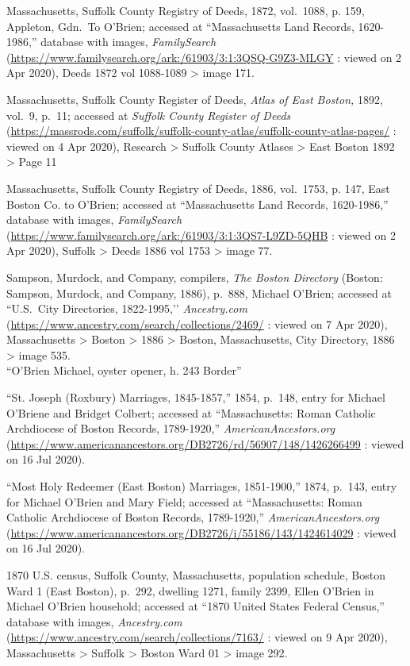 \begin{thebibliography}{999}
	Massachusetts, Suffolk County Registry of Deeds, 1872, vol.\ 1088, p. 159, Appleton, Gdn.\ To O’Brien; accessed at ``Massachusetts Land Records, 1620-1986,'' database with images, \textit{FamilySearch} (\url{https://www.familysearch.org/ark:/61903/3:1:3QSQ-G9Z3-MLGY} : viewed on 2 Apr 2020), Deeds 1872 vol 1088-1089 > image 171.
	
	Massachusetts, Suffolk County Register of Deeds, \textit{Atlas of East Boston,} 1892, vol.\ 9, p.\ 11; accessed at \textit{Suffolk County Register of Deeds} (\url{https://massrods.com/suffolk/suffolk-county-atlas/suffolk-county-atlas-pages/} : viewed on 4 Apr 2020), Research > Suffolk County Atlases > East Boston 1892 > Page 11
	
	Massachusetts, Suffolk County Registry of Deeds, 1886, vol.\ 1753, p. 147, East Boston Co. to O’Brien; accessed at ``Massachusetts Land Records, 1620-1986,'' database with images, \textit{FamilySearch} (\url{https://www.familysearch.org/ark:/61903/3:1:3QS7-L9ZD-5QHB} : viewed on 2 Apr 2020), Suffolk > Deeds 1886 vol 1753 > image 77.
	
	Sampson, Murdock, and Company, compilers, \textit{The Boston Directory} (Boston: Sampson, Murdock, and Company, 1886), p.\ 888, Michael O'Brien; accessed at ``U.S.\ City Directories, 1822-1995,’’ \textit{Ancestry.com} (\url{https://www.ancestry.com/search/collections/2469/} : viewed on 7 Apr 2020), Massachusetts > Boston > 1886 > Boston, Massachusetts, City Directory, 1886 > image 535.\\
	``O'Brien Michael, oyster opener, h. 243 Border''
	
	``St. Joseph (Roxbury) Marriages, 1845-1857,'' 1854, p.\ 148, entry for Michael O'Briene and Bridget Colbert; accessed at ``Massachusetts: Roman Catholic Archdiocese of Boston Records, 1789-1920,'' \textit{AmericanAncestors.org} (\url{https://www.americanancestors.org/DB2726/rd/56907/148/1426266499} : viewed on 16 Jul 2020).
	
	``Most Holy Redeemer (East Boston) Marriages, 1851-1900,'' 1874, p.\ 143, entry for Michael O'Brien and Mary Field; accessed at ``Massachusetts: Roman Catholic Archdiocese of Boston Records, 1789-1920,'' \textit{AmericanAncestors.org} (\url{https://www.americanancestors.org/DB2726/i/55186/143/1424614029} : viewed on 16 Jul 2020).
	
	1870 U.S. census, Suffolk County, Massachusetts, population schedule, Boston Ward 1 (East Boston), p.\ 292, dwelling 1271, family 2399, Ellen O'Brien in Michael O'Brien household; accessed at ``1870 United States Federal Census,'' database with images, \textit{Ancestry.com} (\url{https://www.ancestry.com/search/collections/7163/} : viewed on 9 Apr 2020), Massachusetts > Suffolk > Boston Ward 01 > image 292.
	

\end{thebibliography}
